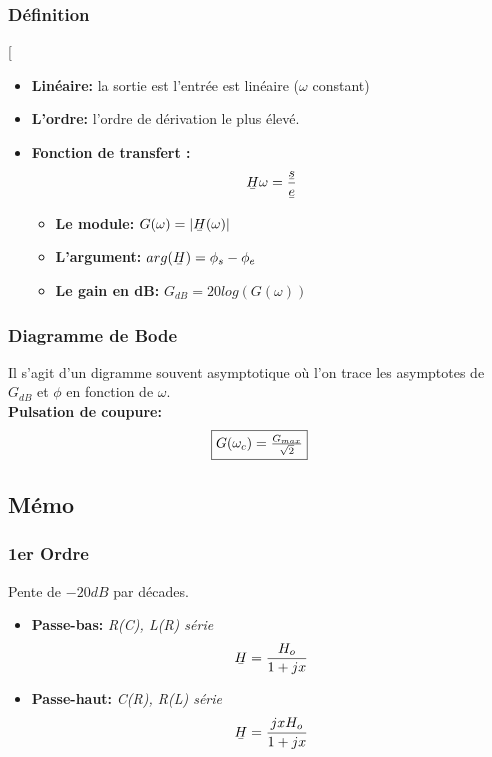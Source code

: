 \documentclass[12pt,hidelinks]{article}
\newcommand{\ubar}[1]{\text{\b{$#1$}}}
\begin{document}
         \subsubsection{Définition}
            \begin{DashedDefinition}{}[
                \begin{itemize}
                    \item \textbf{Linéaire:} la sortie est l'entrée est linéaire ($\omega$ constant)
                    \item \textbf{L'ordre:} l'ordre de dérivation le plus élevé.
                    \item \textbf{Fonction de transfert \ubar{H}:} 
                    \[\ubar{H} \omega = \frac{\ubar{s}}{\ubar{e}}\]
                    \begin{itemize}
                        \item \textbf{Le module:} $G(\omega)= |\ubar{H} (\omega)|$
                        \item \textbf{L'argument:} $arg(\ubar{H}) = \phi_s - \phi_e$
                        \item \textbf{Le gain en dB:} $G_{dB}=20log(G(\omega))$
                    \end{itemize}
                \end{itemize}
            \end{DashedDefinition}
            \subsubsection{Diagramme de Bode}
                Il s'agit d'un digramme souvent asymptotique où l'on trace les asymptotes de $G_{dB}$ et $\phi$ en fonction de $\omega$. \\
                \textbf{Pulsation de coupure:}
                \[\fbox{$G(\omega_c)=\frac{G_{max}}{\sqrt{2}}$}\]
                
    \subsection{Mémo}
        \subsubsection{1er Ordre}
            Pente de $-20dB$ par décades.
            \begin{itemize}
                \item \textbf{Passe-bas:} \textit{R(C), L(R) série} 
                \[\ubar{H}=\frac{H_o}{1+jx}\]
                \item \textbf{Passe-haut:} \textit{C(R), R(L) série} 
                \[\ubar{H}=\frac{jxH_o}{1+jx}\]
            \end{itemize}
\end{document}
